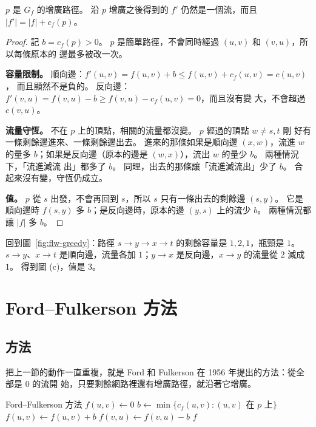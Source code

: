 \begin{lemma}
\label{lem:flw-augment}
$p$ 是 $G_f$ 的增廣路徑。 沿 $p$ 增廣之後得到的 $f'$ 仍然是一個流，而且
$|f'| = |f| + c_f(p)$。
\end{lemma}

\begin{proof}
記 $b = c_f(p) > 0$。 $p$ 是簡單路徑，不會同時經過 $(u, v)$ 和 $(v, u)$，所以每條原本的
邊最多被改一次。

\textbf{容量限制。} 順向邊：$f'(u, v) = f(u, v) + b \le f(u, v) + c_f(u, v) = c(u, v)$，
而且顯然不是負的。 反向邊：$f'(v, u) = f(v, u) - b \ge f(v, u) - c_f(u, v) = 0$，而且沒有變
大，不會超過 $c(v, u)$。

\textbf{流量守恆。} 不在 $p$ 上的頂點，相關的流量都沒變。 $p$ 經過的頂點 $w \ne s, t$ 剛
好有一條剩餘邊進來、一條剩餘邊出去。 進來的那條如果是順向邊 $(x, w)$，流進 $w$ 的量多
$b$；如果是反向邊（原本的邊是 $(w, x)$），流出 $w$ 的量少 $b$。 兩種情況下，「流進減流
出」都多了 $b$。 同理，出去的那條讓「流進減流出」少了 $b$。 合起來沒有變，守恆仍成立。

\textbf{值。} $p$ 從 $s$ 出發，不會再回到 $s$，所以 $s$ 只有一條出去的剩餘邊
$(s, y)$。 它是順向邊時 $f(s, y)$ 多 $b$；是反向邊時，原本的邊 $(y, s)$ 上的流少 $b$。
兩種情況都讓 $|f|$ 多 $b$。
\end{proof}

回到圖~\ref{fig:flw-greedy}：路徑 $s \to y \to x \to t$ 的剩餘容量是 $1, 2, 1$，瓶頸是
$1$。 $s \to y$、$x \to t$ 是順向邊，流量各加 $1$；$y \to x$ 是反向邊，$x \to y$ 的流量從
$2$ 減成 $1$。 得到圖 (c)，值是 $3$。

\section{Ford--Fulkerson 方法}
\label{sec:flw-ff}

\subsection{方法}

把上一節的動作一直重複，就是 Ford 和 Fulkerson 在 1956 年提出的方法：從全部是 $0$ 的流開
始，只要剩餘網路裡還有增廣路徑，就沿著它增廣。

\begin{pseudo}[label=alg:flw-ff]{Ford--Fulkerson 方法}
        \State $f(u, v) \gets 0$
    \EndFor
        \State $b \gets \min\{c_f(u, v) : (u, v) \text{ 在 } p \text{ 上}\}$
                \State $f(u, v) \gets f(u, v) + b$ 
            \Else
                \State $f(v, u) \gets f(v, u) - b$ 
            \EndIf
        \EndFor
    \EndWhile
    \State \Return $f$
\EndProcedure
\end{pseudo}

